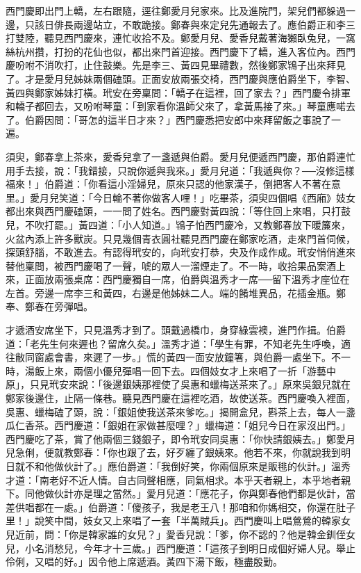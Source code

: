 西門慶即出門上轎，左右跟隨，逕往鄭愛月兒家來。比及進院門，架兒們都躲過一邊，只該日俳長兩邊站立，不敢跪接。鄭春與來定兒先通報去了。應伯爵正和李三打雙陸，聽見西門慶來，連忙收拾不及。鄭愛月兒、愛香兒戴著海獺臥兔兒，一窩絲杭州攢，打扮的花仙也似，都出來門首迎接。西門慶下了轎，進入客位內。西門慶吩咐不消吹打，止住鼓樂。先是李三、黃四見畢禮數，然後鄭家鴇子出來拜見了。才是愛月兒姊妹兩個磕頭。正面安放兩張交椅，西門慶與應伯爵坐下，李智、黃四與鄭家姊妹打橫。玳安在旁稟問：「轎子在這裡，回了家去？」西門慶令排軍和轎子都回去，又吩咐琴童：「到家看你溫師父來了，拿黃馬接了來。」琴童應喏去了。伯爵因問：「哥怎的這半日才來？」西門慶悉把安郎中來拜留飯之事說了一遍。

須臾，鄭春拿上茶來，愛香兒拿了一盞遞與伯爵。愛月兒便遞西門慶，那伯爵連忙用手去接，說：「我錯接，只說你遞與我來。」愛月兒道：「我遞與你？──沒修這樣福來！」伯爵道：「你看這小淫婦兒，原來只認的他家漢子，倒把客人不著在意里。」愛月兒笑道：「今日輪不著你做客人哩！」吃畢茶，須臾四個唱《西廂》妓女都出來與西門慶磕頭，一一問了姓名。西門慶對黃四說：「等住回上來唱，只打鼓兒，不吹打罷。」黃四道：「小人知道。」鴇子怕西門慶冷，又教鄭春放下暖簾來，火盆內添上許多獸炭。只見幾個青衣圓社聽見西門慶在鄭家吃酒，走來門首伺候，探頭舒腦，不敢進去。有認得玳安的，向玳安打恭，央及作成作成。玳安悄俏進來替他稟問，被西門慶喝了一聲，唬的眾人一溜煙走了。不一時，收拾果品案酒上來，正面放兩張桌席：西門慶獨自一席，伯爵與溫秀才一席──留下溫秀才座位在左首。旁邊一席李三和黃四，右邊是他姊妹二人。端的餚堆異品，花插金瓶。鄭奉、鄭春在旁彈唱。

才遞酒安席坐下，只見溫秀才到了。頭戴過橋巾，身穿綠雲襖，進門作揖。伯爵道：「老先生何來遲也？留席久矣。」溫秀才道：「學生有罪，不知老先生呼喚，適往敝同窗處會書，來遲了一步。」慌的黃四一面安放鐘箸，與伯爵一處坐下。不一時，湯飯上來，兩個小優兒彈唱一回下去。四個妓女才上來唱了一折「游藝中原」，只見玳安來說：「後邊銀姨那裡使了吳惠和蠟梅送茶來了。」原來吳銀兒就在鄭家後邊住，止隔一條巷。聽見西門慶在這裡吃酒，故使送茶。西門慶喚入裡面，吳惠、蠟梅磕了頭，說：「銀姐使我送茶來爹吃。」揭開盒兒，斟茶上去，每人一盞瓜仁香茶。西門慶道：「銀姐在家做甚麼哩？」蠟梅道：「姐兒今日在家沒出門。」西門慶吃了茶，賞了他兩個三錢銀子，即令玳安同吳惠：「你快請銀姨去。」鄭愛月兒急俐，便就教鄭春：「你也跟了去，好歹纏了銀姨來。他若不來，你就說我到明日就不和他做伙計了。」應伯爵道：「我倒好笑，你兩個原來是販毴的伙計。」溫秀才道：「南老好不近人情。自古同聲相應，同氣相求。本乎天者親上，本乎地者親下。同他做伙計亦是理之當然。」愛月兒道：「應花子，你與鄭春他們都是伙計，當差供唱都在一處。」伯爵道：「傻孩子，我是老王八！那咱和你媽相交，你還在肚子里！」說笑中間，妓女又上來唱了一套「半萬賊兵」。西門慶叫上唱鶯鶯的韓家女兒近前，問：「你是韓家誰的女兒？」愛香兒說：「爹，你不認的？他是韓金釧侄女兒，小名消愁兒，今年才十三歲。」西門慶道：「這孩子到明日成個好婦人兒。舉止伶俐，又唱的好。」因令他上席遞酒。黃四下湯下飯，極盡殷勤。


